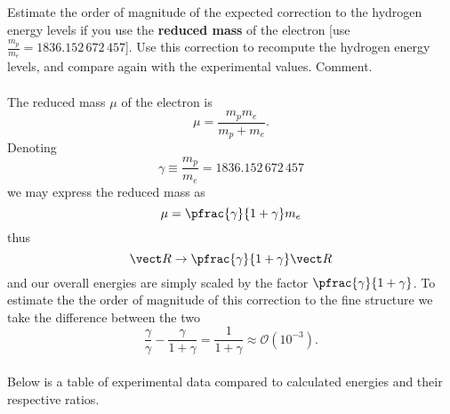 \documentclass[10pt,letterpaper]{article}
\begin{document}
		\item
		Estimate the order of magnitude of the expected correction to the hydrogen energy levels if you use the 
		\textbf{reduced mass} of the electron [use $\frac{m_p}{m_e} = 1836.152\,672\,457$]. Use this correction to 
		recompute the hydrogen energy levels, and compare again with the experimental values. Comment. 
		\\
		\\
		The reduced mass $\mu$ of the electron is 
		\[
			\mu = \frac{m_pm_e}{m_p+m_e}.
		\]
		Denoting 
		\[
			\gamma \equiv \frac{m_p}{m_e} = 1836.152\,672\,457
		\]
		we may express the reduced mass as
		\[
			\mu = \pfrac{\gamma}{1+\gamma}m_e
		\]
		thus
		\[
			\vect R \to \pfrac{\gamma}{1+\gamma}\vect R
		\]
		and our overall energies are simply scaled by the factor $\pfrac{\gamma}{1+\gamma}$. To 
		estimate the the order of magnitude of this correction to the fine structure we
		take the difference between the two
		\[
			\frac{\gamma}{\gamma}-\frac{\gamma}{1+\gamma} = \frac{1}{1+\gamma} \approx \mathcal 
			O(10^{-3}).
		\]
		\\
		Below is 
		a table of experimental data compared to calculated energies and their respective ratios. 
		
\end{document}
